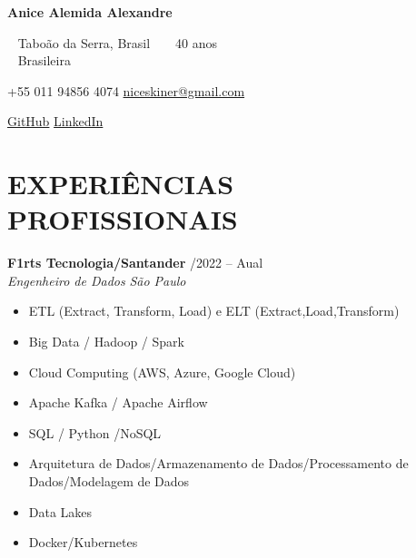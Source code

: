 \documentclass[a4paper,10pt]{article}
\newcommand{\entry}[4]{
  \noindent \textbf{#1} \hfill #2 \\
  \noindent \textit{#3} \hfill \textit{#4} \\
  \vspace{2pt}
}
\begin{document}

\noindent
\begin{minipage}[t]{0.5\textwidth}
\textbf{\Large Anice Alemida Alexandre}

\vspace{0.4em}

\noindent \faMapMarker ~ Taboão da Serra, Brasil ~ \faUser ~ 40 anos \\
\faIdCard ~ Brasileira
\end{minipage}%
\begin{minipage}[t]{0.5\textwidth}
\raggedleft
{\color{blue}} {\faPhone \space +55 011 94856 4074} \quad
{\color{blue}} \href{mailto:niceskiner@gmail.com}{\faEnvelope \space niceskiner@gmail.com}

\vspace{0.2em}

{\color{blue}} \href{https://github.com/Aniceab/}{\faGithub \space GitHub} \quad
{\color{blue}} \href{https://www.linkedin.com/in/anice-almeida/}{\faLinkedin \space LinkedIn} \\
\end{minipage}

\vspace{0.5em}

\section*{EXPERIÊNCIAS PROFISSIONAIS}
\vspace{0.6em}
\entry{F1rts Tecnologia/Santander}{\faCalendar {}/2022  -- Aual }{Engenheiro de Dados}{\faMapMarker \space São Paulo}
\vspace{-1.6em}
\begin{itemize}
\setlength\itemsep{-0.3em}
\item ETL (Extract, Transform, Load) e ELT 
(Extract,Load,Transform)
\item Big Data / Hadoop / Spark
\item Cloud Computing (AWS, Azure, Google Cloud)
\item Apache Kafka / Apache Airflow
\item SQL / Python /NoSQL
\item Arquitetura de Dados/Armazenamento de Dados/Processamento de Dados/Modelagem de Dados
\item Data Lakes
\item Docker/Kubernetes
\end{itemize}
\end{document}
